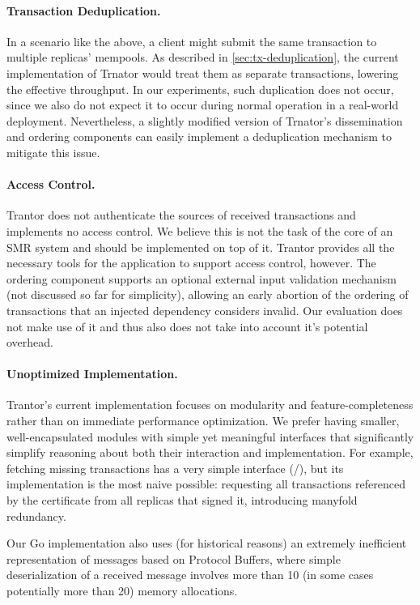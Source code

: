 \documentclass{article}
\begin{document}
\paragraph{Transaction Deduplication.}
In a scenario like the above, a client might submit the same transaction to multiple replicas' mempools.
As described in \cref{sec:tx-deduplication}, the current implementation of Trnator would treat them as separate transactions,
lowering the effective throughput.
In our experiments, such duplication does not occur, since we also do not expect it to occur during normal operation in a real-world deployment.
Nevertheless, a slightly modified version of Trnator's dissemination and ordering components
can easily implement a deduplication mechanism \cite{mirbft,iss} to mitigate this issue.

\paragraph{Access Control.}
Trantor does not authenticate the sources of received transactions and implements no access control.
We believe this is not the task of the core of an SMR system and should be implemented on top of it.
Trantor provides all the necessary tools for the application to support access control, however.
The ordering component supports an optional external input validation mechanism (not discussed so far for simplicity),
allowing an early abortion of the ordering of transactions that an injected dependency considers invalid.
Our evaluation does not make use of it and thus also does not take into account it's potential overhead.

\paragraph{Unoptimized Implementation.}
Trantor's current implementation focuses on modularity and feature-completeness rather than on immediate performance optimization.
We prefer having smaller, well-encapsulated modules with simple yet meaningful interfaces
that significantly simplify reasoning about both their interaction and implementation.
For example, fetching missing transactions has a very simple interface (/),
but its implementation is the most naive possible: requesting all transactions referenced by the certificate from all replicas that signed it,
introducing manyfold redundancy.

Our Go implementation also uses (for historical reasons) an extremely inefficient representation of messages based on Protocol Buffers,
where simple deserialization of a received message involves more than 10 (in some cases potentially more than 20) memory allocations.
\end{document}
